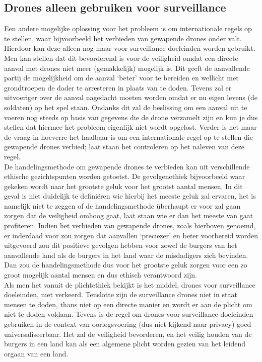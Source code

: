 \subsection{Drones alleen gebruiken voor surveillance}\label{chapter:surveillance}
\subtitle{Dani\"el Brouwer}
Een andere mogelijke oplossing voor het probleem is om internationale regels op te stellen, waar bijvoorbeeld het verbieden van gewapende drones onder valt. Hierdoor kan deze alleen nog maar voor surveillance doeleinden worden gebruikt. Men kan stellen dat dit bevorderend is voor de veiligheid omdat een directe aanval met drones niet meer (gemakkelijk) mogelijk is. Dit geeft de aanvallende partij de mogelijkheid om de aanval `beter' voor te bereiden en wellicht met grondtroepen de dader te arresteren in plaats van te doden. Tevens zal er uitvoeriger over de aanval nagedacht moeten worden omdat er nu eigen levens (de soldaten) op het spel staan. Ondanks dit zal de beslissing om een aanval uit te voeren nog steeds op basis van gegevens die de drone verzamelt zijn en kun je dus stellen dat hiermee het probleem eigenlijk niet wordt opgelost. Verder is het maar de vraag in hoeverre het haalbaar is om een internationale regel op te stellen die gewapende drones verbied; laat staan het controleren op het naleven van deze regel.\\ 

De handelingsmethode om gewapende drones te verbieden kan uit verschillende ethische gezichtspunten worden getoetst. De gevolgenethiek bijvoorbeeld waar gekeken wordt naar het grootste geluk voor het grootst aantal mensen. In dit geval is niet duidelijk te defini\"eren wie hierbij het meeste geluk zal ervaren, het is namelijk niet te zeggen of de handelingsmethode \"uberhaupt er voor zal gaan zorgen dat de veiligheid omhoog gaat, laat staan wie er dan het meeste van gaat profiteren. Indien het verbieden van gewapende drones, zoals hierboven genoemd, er inderdaad voor zou zorgen dat aanvallen `preciezer' en beter voorbereid worden uitgevoerd zou dit positieve gevolgen hebben voor zowel de burgers van het aanvallende land als de burgers in het land waar de misdadigers zich bevinden. Dan zou de handelingsmethode dus voor het grootste geluk zorgen voor een zo groot mogelijk aantal mensen en dus ethisch verantwoord zijn.\\

Als men het vanuit de plichtethiek bekijkt is het middel, drones voor surveillance doeleinden, niet verkeerd. Tenslotte zijn de surveillance drones niet in staat mensen te doden, thans niet op een directe manier en wordt er aan de plicht om niet te doden voldaan. Tevens is de regel om drones voor surveillance doeleinden gebruiken in de context van oorlogsvoering (dus niet kijkend naar privacy) goed universaliseerbaar. Het zal de veiligheid bevorderen, en het veilig houden van de burgers in een land kan als een algemene plicht worden gezien van het leidend orgaan van een land.\\

